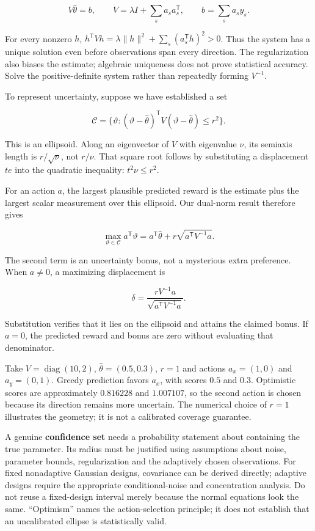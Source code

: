 \[
V\widehat\theta=b,\qquad
V=\lambda I+\sum_s a_sa_s^{\mathsf T},\qquad
b=\sum_s a_sy_s.
\]

For every nonzero \(h\), \(h^{\mathsf T}Vh=\lambda\|h\|^2+\sum_s(a_s^{\mathsf T}h)^2>0\). Thus the system has a unique solution even before observations span every direction. The regularization also biases the estimate; algebraic uniqueness does not prove statistical accuracy. Solve the positive-definite system rather than repeatedly forming \(V^{-1}\).

To represent uncertainty, suppose we have established a set

\[
\mathcal C=\{\vartheta:
(\vartheta-\widehat\theta)^{\mathsf T}V
(\vartheta-\widehat\theta)\le r^2\}.
\]

This is an ellipsoid. Along an eigenvector of \(V\) with eigenvalue \(\nu\), its semiaxis length is \(r/\sqrt\nu\), not \(r/\nu\). That square root follows by substituting a displacement \(te\) into the quadratic inequality: \(t^2\nu\le r^2\).

For an action \(a\), the largest plausible predicted reward is the estimate plus the largest scalar measurement over this ellipsoid. Our dual-norm result therefore gives

\[
\max_{\vartheta\in\mathcal C}a^{\mathsf T}\vartheta
=a^{\mathsf T}\widehat\theta
+r\sqrt{a^{\mathsf T}V^{-1}a}.
\]

The second term is an uncertainty bonus, not a mysterious extra preference. When \(a\ne0\), a maximizing displacement is

\[
\delta=\frac{rV^{-1}a}{\sqrt{a^{\mathsf T}V^{-1}a}}.
\]

Substitution verifies that it lies on the ellipsoid and attains the claimed bonus. If \(a=0\), the predicted reward and bonus are zero without evaluating that denominator.

Take \(V=\operatorname{diag}(10,2)\), \(\widehat\theta=(0.5,0.3)\), \(r=1\) and actions \(a_x=(1,0)\) and \(a_y=(0,1)\). Greedy prediction favors \(a_x\), with scores \(0.5\) and \(0.3\). Optimistic scores are approximately \(0.816228\) and \(1.007107\), so the second action is chosen because its direction remains more uncertain. The numerical choice of \(r=1\) illustrates the geometry; it is not a calibrated coverage guarantee.

A genuine \textbf{confidence set} needs a probability statement about containing the true parameter. Its radius must be justified using assumptions about noise, parameter bounds, regularization and the adaptively chosen observations. For fixed nonadaptive Gaussian designs, covariance can be derived directly; adaptive designs require the appropriate conditional-noise and concentration analysis. Do not reuse a fixed-design interval merely because the normal equations look the same. ``Optimism'' names the action-selection principle; it does not establish that an uncalibrated ellipse is statistically valid.

